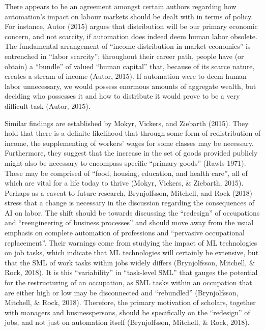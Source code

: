 \documentclass[12pt]{article}
\begin{document}
\begin{flushleft}
\break
\linebreak
There appears to be an agreement amongst certain authors regarding how automation’s impact on labour markets should be dealt with in terms of policy. For instance, Autor (2015) argues that distribution will be our primary economic concern, and not scarcity, if automation does indeed deem human labor obsolete. The fundamental arrangement of “income distribution in market economies” is entrenched in “labor scarcity”; throughout their career path, people have (or obtain) a “bundle” of valued “human capital” that, because of its scarce nature, creates a stream of income (Autor, 2015). If automation were to deem human labor unnecessary, we would possess enormous amounts of aggregate wealth, but deciding who possesses it and how to distribute it would prove to be a very difficult task (Autor, 2015). 

\newpage
Similar findings are established by Mokyr, Vickers, and Ziebarth (2015). They hold that there is a definite likelihood that through some form of redistribution of income, the supplementing of workers’ wages for some classes may be necessary. Furthermore, they suggest that the increase in the set of goods provided publicly might also be necessary to encompass specific “primary goods” (Rawls 1971). These may be comprised of “food, housing, education, and health care”, all of which are vital for a life today to thrive (Mokyr, Vickers, \& Ziebarth, 2015).
\break
\linebreak
Perhaps as a caveat to future research, Brynjolfsson, Mitchell, and Rock (2018) stress that a change is necessary in the discussion regarding the consequences of AI on labor. The shift should be towards discussing the “redesign” of occupations and “reengineering of business processes” and should move away from the usual emphasis on complete automation of professions and “pervasive occupational replacement”. Their warnings come from studying the impact of ML technologies on job tasks, which indicate that ML technologies will certainly be extensive, but that the SML of work tasks within jobs widely differs (Brynjolfsson, Mitchell, \& Rock, 2018). It is this “variability” in “task-level SML” that gauges the potential for the restructuring of an occupation, as SML tasks within an occupation that are either high or low may be disconnected and “rebundled” (Brynjolfsson, Mitchell, \& Rock, 2018). Therefore, the primary motivation of scholars, together with managers and businesspersons, should be specifically on the “redesign” of jobs, and not just on automation itself (Brynjolfsson, Mitchell, \& Rock, 2018).
\end{flushleft}
\end{document}
